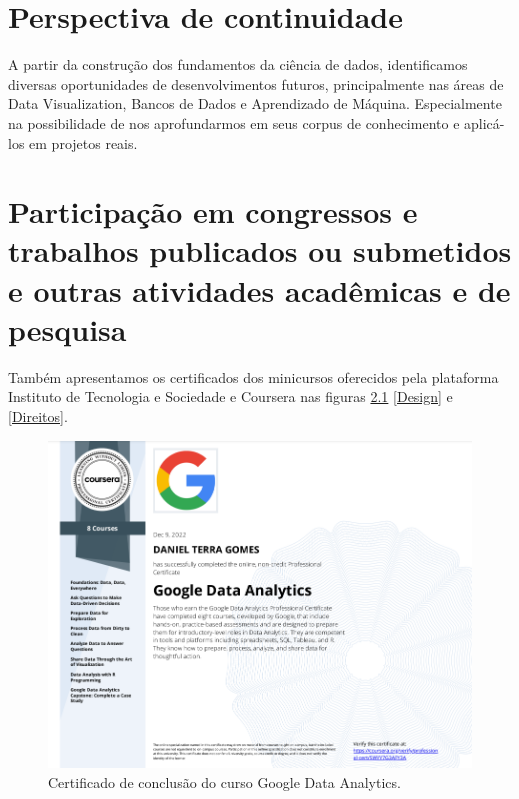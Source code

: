 \chapter{Perspectiva de continuidade} \label{continuidade}
A partir da construção dos fundamentos da ciência de dados, identificamos diversas oportunidades de desenvolvimentos futuros, principalmente nas áreas de Data Visualization, Bancos de Dados e Aprendizado de Máquina. Especialmente na possibilidade de nos aprofundarmos em seus corpus de conhecimento e aplicá-los em projetos reais. 

\chapter{Participação em congressos e trabalhos publicados ou submetidos e outras
atividades acadêmicas e de pesquisa} \label{eventos}

Também apresentamos os certificados dos minicursos oferecidos pela plataforma Instituto de Tecnologia e Sociedade e Coursera  nas figuras \ref{Google} \ref{Design} e \ref{Direitos}.


\begin{figure}[H]
\centering
\includegraphics[width=\textwidth]{Figures/google.png}
\caption{Certificado de conclusão do curso Google Data Analytics.}
\label{Google}
\end{figure}

